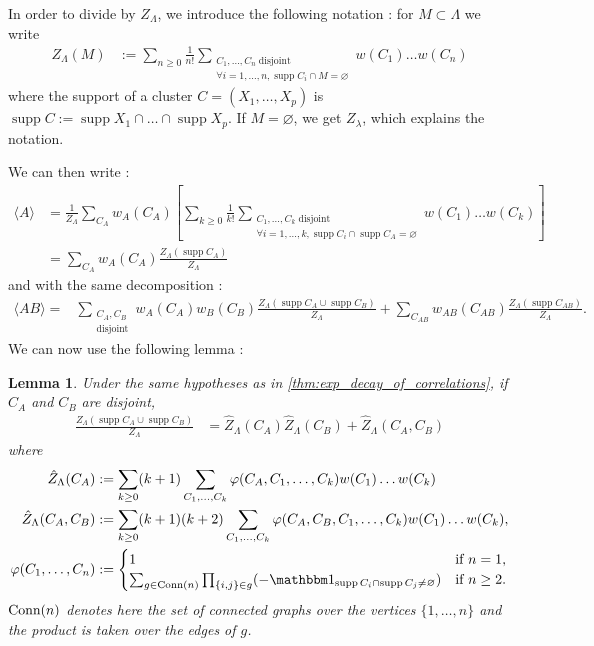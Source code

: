 \documentclass{article}
\newtheorem{lem}{Lemma}
\DeclareMathOperator{\disj}{disjoint}
\DeclareMathOperator{\supp}{supp}
\begin{document}
    In order to divide by $Z_\Lambda$, we introduce the following notation : for $M\subset \Lambda$ we write
    \begin{align*}
        Z_\Lambda(M)&:=\sum_{n\geq0}\frac 1{n!} \sum_{\substack{
            C_1,\ldots,C_n \disj\\
            \forall i=1,\ldots,n, \supp C_i\cap M =\varnothing
            }}w(C_1)\ldots w(C_n)
    \end{align*}
    where the support of a cluster $C=(X_1,\ldots,X_p)$ is $\supp C:=\supp X_1\cap\ldots\cap\supp X_p$.
    If $M=\varnothing$, we get $Z_\lambda$, which explains the notation.
    
    We can then write :
    \begin{align*}
        \langle A\rangle &= \frac 1 {Z_\Lambda}\sum_{C_A}w_A(C_A)\left[\sum_{k\geq 0} \frac 1{k!}\sum_{\substack{C_1,\ldots,C_k\disj\\\forall i=1,\ldots,k, \supp C_i\cap \supp C_A=\varnothing}}w(C_1)\ldots w(C_k)\right]\\
        &=\sum_{C_A}w_A(C_A)\frac{Z_\Lambda(\supp C_A)}{Z_\Lambda}
    \end{align*}
    and with the same decomposition :
    \begin{align*}
        \langle AB\rangle=& \sum_{\substack{C_{A},C_B\\\disj}}w_A(C_A)w_B(C_B)\frac{Z_\Lambda(\supp C_A \cup \supp C_B)}{Z_\Lambda}+\sum_{C_{AB}}w_{AB}(C_{AB})\frac{Z_\Lambda(\supp C_{AB})}{Z_\Lambda}.
    \end{align*}
    We can now use the following lemma :
    \begin{lem}
        \label{lem:Z/Z}
        Under the same hypotheses as in \cref{thm:exp_decay_of_correlations}, if $C_A$ and $C_B$ are disjoint,
        \begin{align*}
            \frac{Z_\Lambda(\supp C_A\cup \supp C_B)}{Z_\Lambda}&=\hat Z_\Lambda(C_A)\hat Z_\Lambda(C_B)+\hat Z_\Lambda(C_A,C_B)
        \end{align*}
        where \begin{align*}
            \hat Z_\Lambda(C_A)&:=\sum_{k\geq 0}(k+1)\sum_{C_1,\ldots,C_k}\varphi(C_A,C_1,\ldots,C_k)w(C_1)\ldots w(C_k)\\
            \hat Z_\Lambda(C_A,C_B)&:=\sum_{k\geq 0}(k+1)(k+2)\sum_{C_1,\ldots,C_k}\varphi(C_A,C_B,C_1,\ldots,C_k)w(C_1)\ldots w(C_k),\\
            \varphi(C_1,\ldots,C_n)&:=\begin{cases}
                1&\textnormal{if $n=1$,}\\
                \sum_{g\in \textnormal{Conn}(n)}\prod_{\{i,j\}\in g}(-\mathbbm 1_{\supp C_i\cap \supp C_j\neq \varnothing})&\textnormal{if $n\geq 2$.}
            \end{cases}
        \end{align*}
        $\textnormal{Conn}(n)$ denotes here the set of connected graphs over the vertices $\{1,\ldots,n\}$ and the product is taken over the edges of $g$.
    \end{lem}
\end{document}
